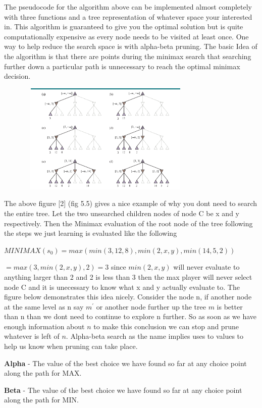 \begin{search_page}
The pseudocode for the algorithm above can be implemented almost completely with three functions and a tree representation of whatever space your interested in. This algorithm is guaranteed to give you the optimal solution but is quite computationally expensive as every node needs to be visited at least once. One way to help reduce the search space is with alpha-beta pruning. The basic Idea of the algorithm is that there are points during the minimax search that searching further down a particular path is unnecessary to reach the optimal minimax decision. 

\includegraphics[width=400px,height=200px]{images/alpha_beta_figure.png}

The above figure [2] (fig 5.5) gives a nice example of why you dont need to search the entire tree. Let the two unsearched children nodes of node C be x and y respectively. Then the Minimax evaluation of the root node of the tree following the steps we just learning is evaluated like the following 

$ MINIMAX(s_{0}) = max(min(3,12,8), min(2,x,y), min(14,5,2)) $

$ = max(3,min(2,x,y),2) = 3 $ since $ min(2,x,y)$ will never evaluate to anything larger than 2 and 2 is less than 3 then the max player will never select node C and it is unecessary to know what x and y actually evaluate to. The figure below demonstrates this idea nicely. Consider the node n, if another node at the same level as n say $ m^{'}$ or another node further up the tree $m$ is better than n than we dont need to continue to explore n further. So as soon as we have enough information about $n$ to make this conclusion we can stop and prune whatever is left of $n$. Alpha-beta search as the name implies uses to values to help us know when pruning can take place.

\textbf{Alpha} - The value of the best choice we have found so far at any choice point along the path for MAX. 

\textbf{Beta} - The value of the best choice we have found so far at any choice point along the path for MIN. 


\end{search_page}
